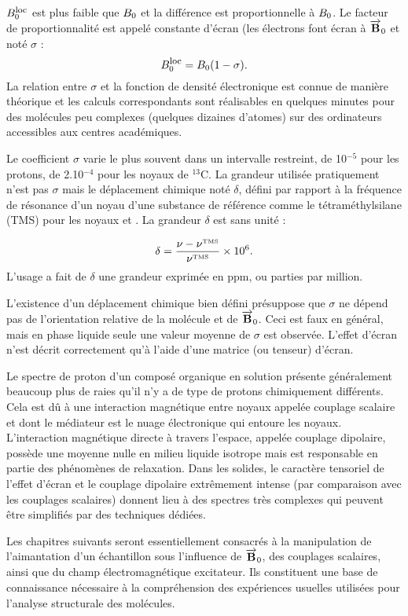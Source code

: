 $B_0^{\mbox{\footnotesize{loc}}}$ est plus faible que $B_0$ et la différence est
proportionnelle à $B_0$.
Le facteur de proportionnalité est appelé constante d'écran (les électrons font écran
à $\overrightarrow{\mathbf{B}}_0$ et noté $\sigma$ :
\begin{equation}
B_0^{\mbox{\footnotesize{loc}}} = B_0(1-\sigma).
\end{equation}
La relation entre $\sigma$ et la fonction de densité électronique est connue
de manière théorique et les calculs correspondants sont réalisables en quelques minutes
pour des molécules peu complexes (quelques dizaines d'atomes) sur des ordinateurs
accessibles aux centres académiques.

Le coefficient $\sigma$ varie le plus souvent dans un intervalle restreint,
de 10$^{-5}$ pour les protons, de 2.10$^{-4}$ pour les noyaux de $^{13}$C.
La grandeur utilisée pratiquement n'est pas $\sigma$ mais le déplacement chimique
noté $\delta$, défini par rapport à la fréquence de
résonance d'un noyau d'une substance de référence comme le tétraméthylsilane
(TMS) pour les noyaux \prot et \carb.
La grandeur $\delta$ est sans unité :

\begin{equation}
\delta = \frac{\nu - \nu^{\mbox{\tiny{TMS}}}}{\nu^{\mbox{\tiny{TMS}}}}\times 10^6.
\end{equation}
L'usage a fait de $\delta$ une grandeur exprimée en ppm, ou parties par million.

L'existence d'un déplacement chimique bien défini présuppose que $\sigma$ ne dépend
pas de l'orientation relative de la molécule et de $\overrightarrow{\mathbf{B}}_0$.
Ceci est faux en général, mais en phase liquide seule
une valeur moyenne de $\sigma$ est observée.
L'effet d'écran n'est décrit correctement qu'à
l'aide d'une matrice (ou tenseur) d'écran.

Le spectre de proton d'un composé organique en solution présente généralement
beaucoup plus de raies qu'il n'y a de type de protons chimiquement différents.
Cela est dû à une interaction magnétique entre noyaux appelée couplage scalaire
et dont le médiateur est le nuage électronique qui entoure les noyaux.
L'interaction magnétique directe à travers l'espace, appelée couplage
dipolaire, possède une moyenne nulle en milieu liquide isotrope mais est responsable
en partie des phénomènes de relaxation.
Dans les solides, le caractère tensoriel de l'effet d'écran et
le couplage dipolaire extrêmement intense (par comparaison
avec les couplages scalaires) donnent lieu à des spectres très complexes
qui peuvent être simplifiés par des techniques dédiées.

Les chapitres suivants seront essentiellement consacrés à la manipulation
de l'aimantation d'un échantillon sous l'influence de
$\overrightarrow{\mathbf{B}}_0$, des couplages scalaires, ainsi que du
champ électromagnétique excitateur.
Ils constituent une base de connaissance nécessaire à la compréhension
des expériences usuelles utilisées pour l'analyse structurale
des molécules.

